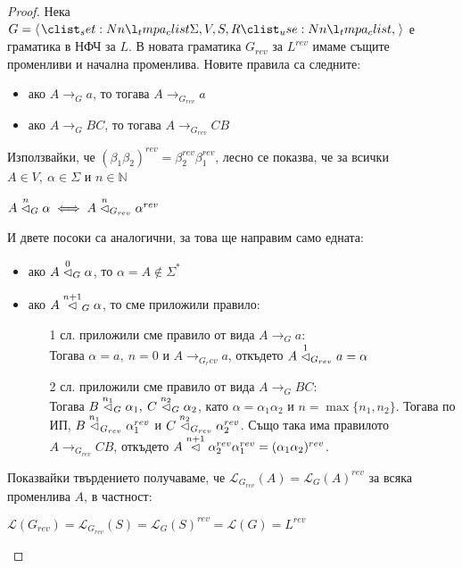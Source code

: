 \begin{proof}
    Нека $G = \opair{\Sigma, V, S, R}$ е граматика в НФЧ за $L$.
    В новата граматика $G_{rev}$ за $L^{rev}$ имаме същите променливи и начална променлива.
    Новите правила са следните:

    \begin{itemize}
        \item ако $A \rightarrow_G a$, то тогава $A \rightarrow_{G_{rev}} a$
        \item ако $A \rightarrow_G BC$, то тогава $A \rightarrow_{G_{rev}} CB$
    \end{itemize}

    Използвайки, че $(\beta_1 \beta_2)^{rev} = \beta_2^{rev} \beta_1^{rev}$, лесно се показва, че за всички $A \in V, \: \alpha \in \Sigma$ и $n \in \mathbb{N}$

    \begin{center}
        $A \stackrel{n}{\vartriangleleft}_G \alpha \iff A \stackrel{n}{\vartriangleleft}_{G_{rev}} \alpha^{rev}$
    \end{center}

    И двете посоки са аналогични, за това ще направим само едната:

    \begin{itemize}
        \item ако $A \stackrel{0}{\vartriangleleft}_G \alpha$, то $\alpha = A \notin \Sigma^*$ \checkmark
        \item ако $A \stackrel{n + 1}{\vartriangleleft}_G \alpha$, то сме приложили правило:
              \begin{itemize}
                  \item[1 сл.] приложили сме правило от вида $A \rightarrow_G a$: \\
                      Тогава $\alpha = a, \: n = 0$ и $A \rightarrow_{G_rev} a$, откъдето $A \stackrel{1}{\vartriangleleft}_{G_{rev}} a = \alpha$
                  \item[2 сл.] приложили сме правило от вида $A \rightarrow_G BC$: \\
                      Тогава $B \stackrel{n_1}{\vartriangleleft}_G \alpha_1, \: C \stackrel{n_2}{\vartriangleleft}_G \alpha_2$, като $\alpha = \alpha_1 \alpha_2$ и $n = \max \{ n_1, n_2 \}$.
                      Тогава по ИП, $B \stackrel{n_1}{\vartriangleleft}_{G_{rev}} \alpha_1^{rev}$ и $C \stackrel{n_2}{\vartriangleleft}_{G_{rev}} \alpha_2^{rev}$.
                      Също така има правилото $A \rightarrow_{G_{rev}} CB$, откъдето $A \stackrel{n + 1}{\vartriangleleft} \alpha_2^{rev} \alpha_1^{rev} = (\alpha_1 \alpha_2)^{rev}$.
              \end{itemize}
    \end{itemize}

    Показвайки твърдението получаваме, че $\mathcal{L}_{G_{rev}}(A) = \mathcal{L}_G(A)^{rev}$ за всяка променлива $A$, в частност:

    \begin{center}
        $\mathcal{L}(G_{rev}) = \mathcal{L}_{G_{rev}}(S) = \mathcal{L}_G(S)^{rev} = \mathcal{L}(G) = L^{rev}$
    \end{center}
\end{proof}

